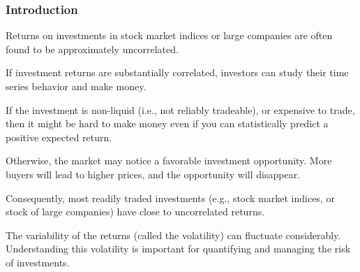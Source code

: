 \begin{frame}[fragile]

\frametitle{Introduction}

\bi

\item Returns on investments in stock market indices or large companies are often found to be approximately uncorrelated. 

\item If investment returns are substantially correlated, investors can study their time series behavior and make money. 

\item If the investment is non-liquid (i.e., not reliably tradeable), or expensive to trade, then it might be hard to make money even if you can statistically predict a positive expected return.

\item Otherwise, the market may notice a favorable investment opportunity. More buyers will lead to higher prices, and the opportunity will disappear.

\item Consequently, most readily traded investments (e.g., stock market indices, or stock of large companies) have close to uncorrelated returns.

\item The variability of the returns (called the volatility) can fluctuate considerably. Understanding this volatility is important for quantifying and managing the risk of investments. 

\ei

\end{frame}

